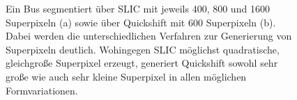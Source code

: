 \begin{figure}[t]
\centering
{}
  \caption[\gls{SLIC} und Quickshift Beispielresultat]{Ein Bus segmentiert über \gls{SLIC} mit jeweils 400, 800 und 1600 Superpixeln (a) sowie über Quickshift mit 600 Superpixeln (b).
  Dabei werden die unterschiedlichen Verfahren zur Generierung von Superpixeln deutlich.
  Wohingegen \gls{SLIC} möglichst quadratische, gleichgroße Superpixel erzeugt, generiert Quickshift sowohl sehr große wie auch sehr kleine Superpixel in allen möglichen Formvariationen.}
\label{fig:slic_quickshift}
\end{figure}

